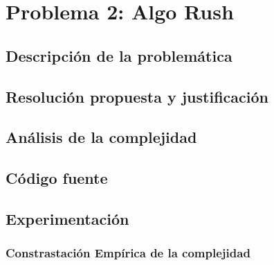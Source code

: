 \section{Problema 2: Algo Rush}

\subsection{Descripción de la problemática}

\subsection{Resolución propuesta y justificación}

\subsection{Análisis de la complejidad}

\subsection{Código fuente}

\subsection{Experimentación}

\subsubsection{Constrastación Empírica de la complejidad}